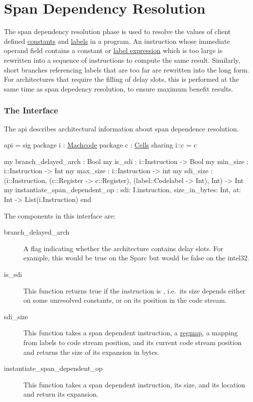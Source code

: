 \section{Span Dependency Resolution} \label{sec:span-dep}

The span dependency resolution phase is used to resolve the values of
client defined \href{constants.html}{constants} and \href{labels.html}{labels}
in a program.  An instruction whose immediate operand field contains a
constant or \href{label_expression.html}{label expression} which
is too large is rewritten into a sequence of instructions to compute
the same result.  Similarly, short branches referencing labels that are 
too far are rewritten into the long form.   For architectures
that require the filling of delay slots, this is performed at the same
time as span depedency resolution, to ensure maximum benefit results.

\subsubsection{The Interface}

The api  describes
architectural information about span dependence resolution.

\begin{SML}
api  = sig
  package i : \href{instructions.html}{Machcode}
  package c : \href{cells.html}{Cells}
    sharing i::c = c

  my branch_delayed_arch : Bool
  my is_sdi : i::Instruction -> Bool
  my min_size : i::Instruction -> Int
  my max_size : i::Instruction -> int
  my sdi_size : (i::Instruction, (c::Register -> c::Register), (label::Codelabel -> Int), Int) -> Int
  my instantiate_span_dependent_op : { sdi: I.instruction, size_in_bytes: Int, at: Int } -> List(i.Instruction) 
end
\end{SML}

The components in this interface are:
\begin{description}
  \item[branch_delayed_arch] A flag indicating whether the architecture
contains delay slots.  For example, this would be true on the 
Sparc but would be false on the intel32.
   \item[is_sdi] This function returns true if the instruction is 
, i.e.~its size depends either on some unresolved
constants, or on its position in the code stream.
   \item[sdi_size]  This function takes a span dependent instruction, 
a \href{regmap.html}{regmap},
a mapping from labels to code stream position, and 
its current code stream position and returns the size of its
expansion in bytes.
   \item[instantiate_span_dependent_op] This function takes a span dependent instruction,
its size, and its location and return its expansion.
\end{description}

